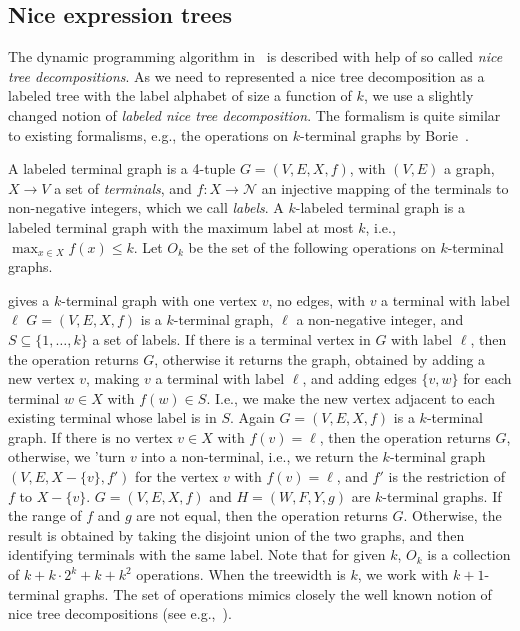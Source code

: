 \documentclass[a4paper,11pt]{article}
\theoremstyle{definition}
\theoremstyle{remark}
\begin{document}
\subsection{Nice expression trees}
The dynamic programming algorithm in~\cite{BodlaenderK96} is described
with help of so called {\em nice tree decompositions}.  As we need to
represented a nice tree decomposition as a labeled tree with the label
alphabet of size a function of $k$, we use a slightly changed notion
of {\em labeled nice tree decomposition}.  The formalism is quite
similar to existing formalisms, e.g., the operations on $k$-terminal
graphs by Borie~\cite{Borie88}.

A labeled terminal graph is a 4-tuple $G=(V,E,X,f)$, with $(V,E)$ a
graph, $X \rightarrow V$ a set of {\em terminals}, and $f: X
\rightarrow {\mathcal{N}}$ an injective mapping of the terminals to
non-negative integers, which we call {\em labels}.  A $k$-labeled
terminal graph is a labeled terminal graph with the maximum label at
most $k$, i.e., $\max_{x\in X} f(x)\leq k$.  Let $O_k$ be the set of
the following operations on $k$-terminal graphs.


\vskip 0.3cm
 gives a $k$-terminal graph with one vertex $v$,
  no edges, with $v$ a terminal with label $\ell$
  \vskip 0.3cm
   $G = (V,E,X,f)$ is a
  $k$-terminal graph, $\ell$ a non-negative integer, and $S \subseteq
  \{1, \ldots, k\}$ a set of labels.  If there is a terminal vertex in
  $G$ with label $\ell$, then the operation returns $G$, otherwise it
  returns the graph, obtained by adding a new vertex $v$, making $v$ a
  terminal with label $\ell$, and adding edges $\{v,w\}$ for each
  terminal $w\in X$ with $f(w)\in S$.  I.e., we make the new vertex
  adjacent to each existing terminal whose label is in $S$.  \vskip
  0.3cm
   Again $G=(V,E,X,f)$ is a
  $k$-terminal graph.  If there is no vertex $v\in X$ with
  $f(v)=\ell$, then the operation returns $G$, otherwise, we 'turn $v$
  into a non-terminal, i.e., we return the $k$-terminal graph
  $(V,E,X-\{v\},f')$ for the vertex $v$ with $f(v)=\ell$, and $f'$ is
  the restriction of $f$ to $X-\{v\}$.  \vskip 0.3cm
   $G =(V,E,X,f)$ and $H=(W,F,Y,g)$ are
  $k$-terminal graphs.  If the range of $f$ and $g$ are not equal,
  then the operation returns $G$.  Otherwise, the result is obtained
  by taking the disjoint union of the two graphs, and then identifying
  terminals with the same label.
\vskip 0.3cm Note that for given $k$, $O_k$ is a collection of $k +
  k\cdot 2^k + k + k^2$ operations.  When the treewidth is $k$, we
  work with $k+1$-terminal graphs.  The set of operations mimics
  closely the well known notion of nice tree decompositions (see
  e.g.,~\cite{Kloks93,Bodlaender98}).
\end{document}
